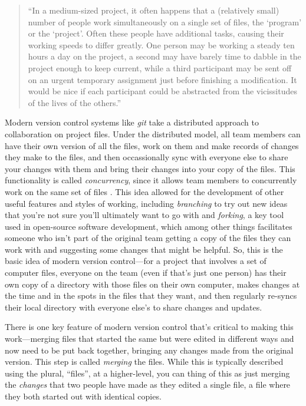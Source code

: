 \documentclass[]{tufte-book}
\begin{document}
\begin{quote}
``In a medium-sized project, it often happens that a (relatively small) number
of people work simultaneously on a single set of files, the `program' or the
`project'. Often these people have additional tasks, causing their working
speeds to differ greatly. One person may be working a steady ten hours a day on
the project, a second may have barely time to dabble in the project enough to
keep current, while a third participant may be sent off on an urgent temporary
assignment just before finishing a modification. It would be nice if each
participant could be abstracted from the vicissitudes of the lives of the
others.'' \citep{grune1986concurrent}
\end{quote}

Modern version control systems like \emph{git} take a distributed approach to
collaboration on project files. Under the distributed model, all team members
can have their own version of all the files, work on them and make records of
changes they make to the files, and then occassionally sync with everyone else
to share your changes with them and bring their changes into your copy of the
files. This functionality is called \emph{concurrency}, since it allows team members
to concurrently work on the same set of files \citep{raymondunderstanding}. This idea
allowed for the development of other useful features and styles of working,
including \emph{branching} to try out new ideas that you're not sure you'll
ultimately want to go with and \emph{forking}, a key tool used in open-source
software development, which among other things facilitates someone who isn't
part of the original team getting a copy of the files they can work with and
suggesting some changes that might be helpful. So, this is the basic idea of
modern version control---for a project that involves a set of computer files,
everyone on the team (even if that's just one person) has their own copy of a
directory with those files on their own computer, makes changes at the time and
in the spots in the files that they want, and then regularly re-syncs their
local directory with everyone else's to share changes and updates.

There is one key feature of modern version control that's critical to making
this work---merging files that started the same but were edited in different
ways and now need to be put back together, bringing any changes made from the
original version. This step is called \emph{merging} the files. While this is
typically described using the plural, ``files'', at a higher-level, you can thing
of this as just merging the \emph{changes} that two people have made as they edited a
single file, a file where they both started out with identical copies.
\end{document}
